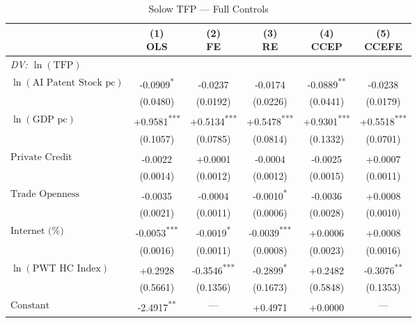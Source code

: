 \begin{table}[htbp]
\centering
\small
\caption{Solow TFP --- Full Controls}
\label{tab:tab_solow_full}
\begin{tabular}{lccccc}
\toprule
 & \makecell{(1)\\OLS} & \makecell{(2)\\FE} & \makecell{(3)\\RE} & \makecell{(4)\\CCEP} & \makecell{(5)\\CCEFE} \\
\midrule
\multicolumn{6}{l}{\textit{DV: $\ln(\text{TFP})$}} \\[4pt]
$\ln(\text{AI Patent Stock pc})$ & -0.0909\textsuperscript{*} & -0.0237\textsuperscript{} & -0.0174\textsuperscript{} & -0.0889\textsuperscript{**} & -0.0238\textsuperscript{} \\
 & (0.0480) & (0.0192) & (0.0226) & (0.0441) & (0.0179) \\[2pt]
$\ln(\text{GDP pc})$ & +0.9581\textsuperscript{***} & +0.5134\textsuperscript{***} & +0.5478\textsuperscript{***} & +0.9301\textsuperscript{***} & +0.5518\textsuperscript{***} \\
 & (0.1057) & (0.0785) & (0.0814) & (0.1332) & (0.0701) \\[2pt]
$\text{Private Credit}$ & -0.0022\textsuperscript{} & +0.0001\textsuperscript{} & -0.0004\textsuperscript{} & -0.0025\textsuperscript{} & +0.0007\textsuperscript{} \\
 & (0.0014) & (0.0012) & (0.0012) & (0.0015) & (0.0011) \\[2pt]
$\text{Trade Openness}$ & -0.0035\textsuperscript{} & -0.0004\textsuperscript{} & -0.0010\textsuperscript{*} & -0.0036\textsuperscript{} & +0.0008\textsuperscript{} \\
 & (0.0021) & (0.0011) & (0.0006) & (0.0028) & (0.0010) \\[2pt]
$\text{Internet (\%)}$ & -0.0053\textsuperscript{***} & -0.0019\textsuperscript{*} & -0.0039\textsuperscript{***} & +0.0006\textsuperscript{} & +0.0008\textsuperscript{} \\
 & (0.0016) & (0.0011) & (0.0008) & (0.0023) & (0.0016) \\[2pt]
$\ln(\text{PWT HC Index})$ & +0.2928\textsuperscript{} & -0.3546\textsuperscript{***} & -0.2899\textsuperscript{*} & +0.2482\textsuperscript{} & -0.3076\textsuperscript{**} \\
 & (0.5661) & (0.1356) & (0.1673) & (0.5848) & (0.1353) \\[2pt]
$\text{Constant}$ & -2.4917\textsuperscript{**} & --- & +0.4971\textsuperscript{} & +0.0000\textsuperscript{} & --- \\

\end{tabular}
\end{table}
